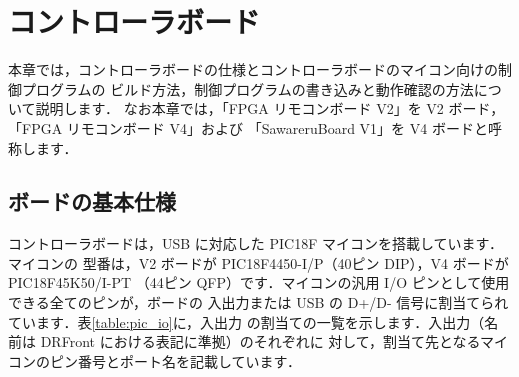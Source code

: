\chapter{コントローラボード}

本章では，コントローラボードの仕様とコントローラボードのマイコン向けの制御プログラムの
ビルド方法，制御プログラムの書き込みと動作確認の方法について説明します．
なお本章では，「FPGA リモコンボード V2」を V2 ボード，「FPGA リモコンボード V4」および
「SawareruBoard V1」を V4 ボードと呼称します．

\section{ボードの基本仕様}

コントローラボードは，USB に対応した PIC18F マイコンを搭載しています．マイコンの
型番は，V2 ボードが PIC18F4450-I/P（40ピン DIP），V4 ボードが PIC18F45K50/I-PT
（44ピン QFP）です．マイコンの汎用 I/O ピンとして使用できる全てのピンが，ボードの
入出力または USB の D+/D- 信号に割当てられています．表\ref{table:pic_io}に，入出力
の割当ての一覧を示します．入出力（名前は DRFront における表記に準拠）のそれぞれに
対して，割当て先となるマイコンのピン番号とポート名を記載しています．

